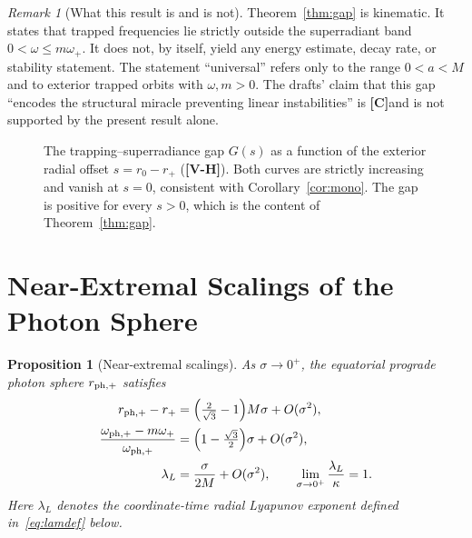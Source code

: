 \documentclass[11pt, a4paper]{article}
\newcommand{\VH}{\textcolor{vh}{\textbf{[V-H]}}}
\newcommand{\CC}{\textcolor{cc}{\textbf{[C]}}}
\newtheorem{proposition}[theorem]{Proposition}
\theoremstyle{remark}
\newtheorem{remark}[theorem]{Remark}
\theoremstyle{definition}
\begin{document}
\begin{remark}[What this result is and is not]
Theorem~\ref{thm:gap} is kinematic. It states that trapped frequencies lie strictly outside the superradiant band $0<\omega\le m\omega_+$. It does not, by itself, yield any energy estimate, decay rate, or stability statement. The statement ``universal'' refers only to the range $0<a<M$ and to exterior trapped orbits with $\omega, m > 0$. The drafts' claim that this gap ``encodes the structural miracle preventing linear instabilities'' is \CC and is not supported by the present result alone.
\end{remark}

\begin{figure}[H]
\centering
{}
\caption{The trapping--superradiance gap $G(s)$ as a function of the exterior radial offset $s = r_0 - r_+$ (\VH). Both curves are strictly increasing and vanish at $s = 0$, consistent with Corollary~\ref{cor:mono}. The gap is positive for every $s>0$, which is the content of Theorem~\ref{thm:gap}.}
\label{fig:gap}
\end{figure}

\section{Near-Extremal Scalings of the Photon Sphere}
\label{sec:triple}

\begin{proposition}[Near-extremal scalings]
\label{prop:triple}
As $\sigma\to 0^+$, the equatorial prograde photon sphere $r_{{\rm ph},+}$ satisfies
\begin{align}
r_{{\rm ph},+} - r_+ &= \Bigl(\tfrac{2}{\sqrt3} - 1\Bigr) M\sigma + O(\sigma^2), \label{eq:rph}\\
\frac{\omega_{{\rm ph},+} - m\omega_+}{\omega_{{\rm ph},+}} &= \Bigl(1 - \tfrac{\sqrt3}{2}\Bigr)\sigma + O(\sigma^2), \label{eq:gapph}\\
\lambda_L &= \frac{\sigma}{2M} + O(\sigma^2), \qquad \lim_{\sigma\to0^+}\frac{\lambda_L}{\kappa} = 1. \label{eq:lam}
\end{align}
Here $\lambda_L$ denotes the coordinate-time radial Lyapunov exponent defined in~\eqref{eq:lamdef} below.
\end{proposition}
\end{document}
